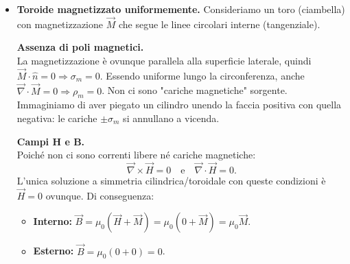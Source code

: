 \documentclass{book}
\begin{document}
\begin{itemize}
  Per ottenere una densità di corrente proporzionale a \(\sin\theta\) sulla superficie curva, è sufficiente avvolgere il filo in modo che la \textbf{densità di spire lungo l'asse \(z\) sia costante}.
  
  Dimostriamolo geometricamente:
  \begin{itemize}
      \item Consideriamo un intervallo verticale \(dz\). La corrente contenuta in questa fascia è \(dI = n I_0 dz\) (dove \(n\) è la densità di spire per metro verticale e \(I_0\) la corrente nel filo).
      \item Sulla superficie della sfera, questo intervallo \(dz\) corrisponde a un arco di lunghezza \(ds\). La relazione geometrica è \(dz = ds \cdot \sin\theta\) (proiezione verticale).
      \item La densità superficiale di corrente \(K\) è la corrente per unità di lunghezza d'arco \(ds\):
      \[
      K = \frac{dI}{ds} = \frac{n I_0 \, dz}{dz / \sin\theta} = n I_0 \sin\theta.
      \]
  \end{itemize}
  \textbf{Conclusione:} Avvolgendo un filo attorno a una sfera con una spaziatura uniforme in verticale (come se stessimo affettando la sfera in dischi di uguale spessore), otteniamo la distribuzione \(\sin\theta\) necessaria per creare un campo magnetico interno uniforme.

\item \textbf{Toroide magnetizzato uniformemente.}  
  Consideriamo un toro (ciambella) con magnetizzazione \(\vec{M}\) che segue le linee circolari interne (tangenziale).

  \textbf{Assenza di poli magnetici.} \\
  La magnetizzazione è ovunque parallela alla superficie laterale, quindi \(\vec{M} \cdot \hat{n} = 0 \Rightarrow \sigma_m = 0\). Essendo uniforme lungo la circonferenza, anche \(\vec{\nabla}\cdot\vec{M}=0 \Rightarrow \rho_m = 0\).
  Non ci sono "cariche magnetiche" sorgente. Immaginiamo di aver piegato un cilindro unendo la faccia positiva con quella negativa: le cariche \(\pm \sigma_m\) si annullano a vicenda.

  \textbf{Campi H e B.} \\
  Poiché non ci sono correnti libere né cariche magnetiche:
  \[
  \vec{\nabla} \times \vec{H} = 0 \quad \text{e} \quad \vec{\nabla} \cdot \vec{H} = 0.
  \]
  L'unica soluzione a simmetria cilindrica/toroidale con queste condizioni è \(\vec{H} = 0\) ovunque.
  Di conseguenza:
  \begin{itemize}
      \item \textbf{Interno:} \(\vec{B} = \mu_0(\vec{H} + \vec{M}) = \mu_0(0 + \vec{M}) = \mu_0 \vec{M}\).
      \item \textbf{Esterno:} \(\vec{B} = \mu_0(0 + 0) = 0\).
  \end{itemize}


\end{itemize}
\end{document}
